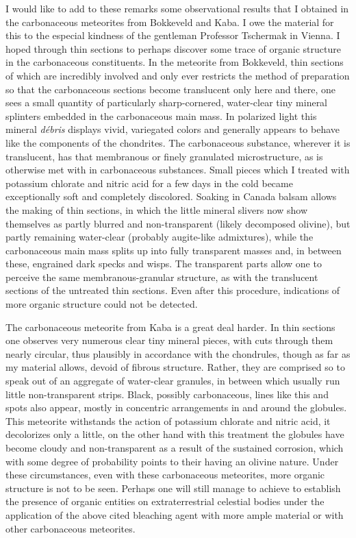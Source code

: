 \documentclass[a4paper, 12pt, oneside]{article}
\begin{document}
I would like to add to these remarks some observational results that I obtained in the carbonaceous meteorites from Bokkeveld and Kaba. I owe the material for this to the especial kindness of the gentleman Professor Tschermak in Vienna. I hoped through thin sections to perhaps discover some trace of organic structure in the carbonaceous constituents. In the meteorite from Bokkeveld, thin sections of which are incredibly involved and only ever restricts the method of preparation so that the carbonaceous sections become translucent only here and there, one sees a small quantity of particularly sharp-cornered, water-clear tiny mineral splinters embedded in the carbonaceous main mass. In polarized light this mineral \emph{débris} displays vivid, variegated colors and generally appears to behave like the components of the chondrites. The carbonaceous substance, wherever it is translucent, has that membranous or finely granulated microstructure, as is otherwise met with in carbonaceous substances. Small pieces which I treated with potassium chlorate and nitric acid for a few days in the cold became exceptionally soft and completely discolored. Soaking in Canada balsam allows the making of thin sections, in which the little mineral slivers now show themselves as partly blurred and non-transparent (likely decomposed olivine), but partly remaining water-clear (probably augite-like admixtures), while the carbonaceous main mass splits up into fully transparent masses and, in between these, engrained dark specks and wisps. The transparent parts allow one to perceive the same membranous-granular structure, as with the translucent sections of the untreated thin sections. Even after this procedure, indications of more organic structure could not be detected.

The carbonaceous meteorite from Kaba is a great deal harder. In thin sections one observes very numerous clear tiny mineral pieces, with cuts through them nearly circular, thus plausibly in accordance with the chondrules, though as far as my material allows, devoid of fibrous structure. Rather, they are comprised so to speak out of an aggregate of water-clear granules, in between which usually run little non-transparent strips. Black, possibly carbonaceous, lines like this and spots also appear, mostly in concentric arrangements in and around the globules. This meteorite withstands the action of potassium chlorate and nitric acid, it decolorizes only a little, on the other hand with this treatment the globules have become cloudy and non-transparent as a result of the sustained corrosion, which with some degree of probability points to their having an olivine nature. Under these circumstances, even with these carbonaceous meteorites, more organic structure is not to be seen. Perhaps one will still manage to achieve to establish the presence of organic entities on extraterrestrial celestial bodies under the application of the above cited bleaching agent with more ample material or with other carbonaceous meteorites.
\clearpage
\end{document}
